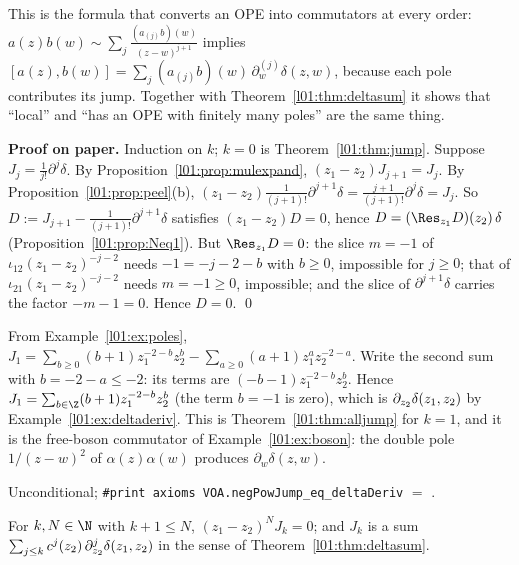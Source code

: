\begin{physics}
This is the formula that converts an OPE into commutators at every order:
$a(z)b(w)\sim\sum_j\frac{(a_{(j)}b)(w)}{(z-w)^{j+1}}$ implies
$[a(z),b(w)] = \sum_j(a_{(j)}b)(w)\,\partial_w^{(j)}\delta(z,w)$, because each pole contributes its jump. Together with
Theorem~\ref{l01:thm:deltasum} it shows that ``local'' and ``has an OPE with finitely many poles'' are the same
thing.
\end{physics}

\textbf{Proof on paper.} Induction on $k$; $k = 0$ is Theorem~\ref{l01:thm:jump}. Suppose
$J_j = \frac1{j!}\partial^j\delta$. By Proposition~\ref{l01:prop:mulexpand}, $(z_1-z_2)J_{j+1} = J_j$. By
Proposition~\ref{l01:prop:peel}(b), $(z_1-z_2)\frac1{(j+1)!}\partial^{j+1}\delta = \frac{j+1}{(j+1)!}\partial^j\delta = J_j$.
So $D := J_{j+1}-\frac1{(j+1)!}\partial^{j+1}\delta$ satisfies $(z_1-z_2)D = 0$, hence
$D = (\Res_{z_1}D)(z_2)\,\delta$ (Proposition~\ref{l01:prop:Neq1}). But $\Res_{z_1}D = 0$: the slice $m = -1$ of
$\iota_{12}(z_1-z_2)^{-j-2}$ needs $-1 = -j-2-b$ with $b\ge0$, impossible for $j\ge0$; that of
$\iota_{21}(z_1-z_2)^{-j-2}$ needs $m = -1\ge0$, impossible; and the slice of $\partial^{j+1}\delta$ carries the factor
$-m-1 = 0$. Hence $D = 0$. \qed

\begin{example}\label{l01:ex:doublejump}
From Example~\ref{l01:ex:poles}, $J_1 = \sum_{b\ge0}(b+1)z_1^{-2-b}z_2^{b}-\sum_{a\ge0}(a+1)z_1^{a}z_2^{-2-a}$. Write the
second sum with $b = -2-a\le-2$: its terms are $(-b-1)z_1^{-2-b}z_2^{b}$. Hence
$J_1 = \sum_{b\in\Z}(b+1)z_1^{-2-b}z_2^{b}$ (the term $b = -1$ is zero), which is $\partial_{z_2}\delta(z_1,z_2)$ by
Example~\ref{l01:ex:deltaderiv}. This is Theorem~\ref{l01:thm:alljump} for $k = 1$, and it is the free-boson
commutator of Example~\ref{l01:ex:boson}: the double pole $1/(z-w)^2$ of $\alpha(z)\alpha(w)$ produces $\partial_w\delta(z,w)$.
\end{example}

\begin{status}
Unconditional; \texttt{\#print axioms VOA.negPowJump\_eq\_deltaDeriv} $=$
.
\end{status}

\begin{corollary}\label{l01:cor:jumplocal}
For $k,N\in\N$ with $k+1\le N$, $(z_1-z_2)^NJ_k = 0$; and $J_k$ is a sum
$\sum_{j\le k}c^j(z_2)\,\partial^j_{z_2}\delta(z_1,z_2)$ in the sense of Theorem~\ref{l01:thm:deltasum}.
\end{corollary}

